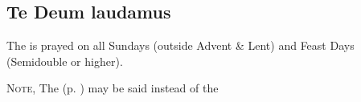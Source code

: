 \subsection{Te Deum laudamus}

\begin{rubric}
The  is prayed on all Sundays (outside Advent \& Lent) and Feast Days %
(Semidouble or higher).\par
\textsc{Note,} The  (p. \pageref{OT}) may be said instead of the 
\end{rubric}

